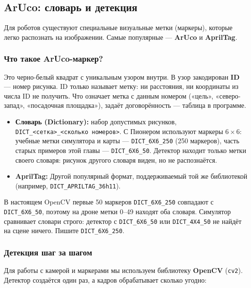 \subsection{ArUco: словарь и детекция}
\label{sec:python-aruco}

Для роботов существуют специальные визуальные метки (маркеры), которые легко распознать на изображении. Самые популярные — \textbf{ArUco} и \textbf{AprilTag}.

\subsubsection*{Что такое ArUco-маркер?}
Это черно-белый квадрат с уникальным узором внутри. В узор закодирован \textbf{ID} --- номер рисунка. ID только называет метку: ни расстояния, ни координаты из числа ID не получить. Что означает метка с данным номером («цель», «северо-запад», «посадочная площадка»), задаёт договорённость --- таблица в программе.
\begin{itemize}
    \item \textbf{Словарь (Dictionary):} набор допустимых рисунков, \verb|DICT_<сетка>_<сколько номеров>|. С Пионером используют маркеры $6\times6$: учебные метки симулятора и карты --- \texttt{DICT\_6X6\_250} (250 маркеров), часть старых примеров этой главы --- \texttt{DICT\_6X6\_50}. Детектор находит только метки своего словаря: рисунок другого словаря виден, но не распознаётся.
    \item \textbf{AprilTag:} Другой популярный формат, поддерживаемый той же библиотекой (например, \texttt{DICT\_APRILTAG\_36h11}).
\end{itemize}

\begin{warnbox}
В настоящем OpenCV первые 50 маркеров \texttt{DICT\_6X6\_250} совпадают с \texttt{DICT\_6X6\_50}, поэтому на дроне метки 0--49 находят оба словаря. Симулятор сравнивает словари строго: детектор с \texttt{DICT\_6X6\_50} или \texttt{DICT\_4X4\_50} не найдёт на сцене ничего. Пишите \texttt{DICT\_6X6\_250}.
\end{warnbox}

\subsubsection*{Детекция шаг за шагом}
Для работы с камерой и маркерами мы используем библиотеку \textbf{OpenCV} (\texttt{cv2}). Детектор создаётся один раз, а кадров обрабатывает сколько угодно:

